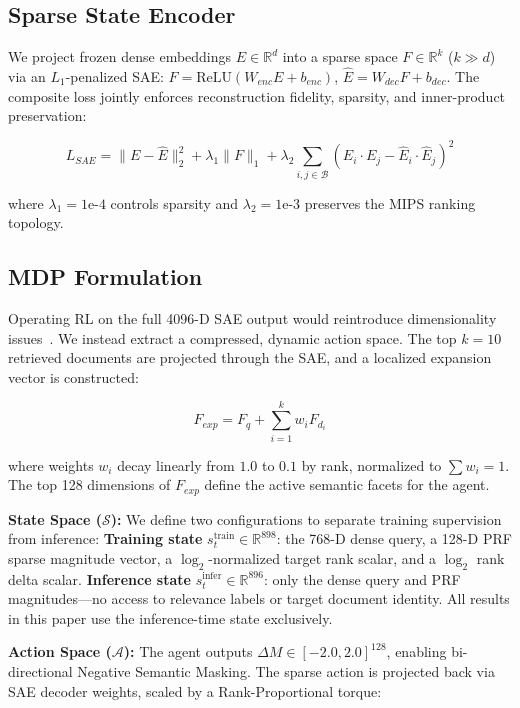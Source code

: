 \documentclass[sigconf]{acmart}
\begin{document}
\subsection{Sparse State Encoder}

We project frozen dense embeddings $E \in \mathbb{R}^d$ into a sparse space $F \in \mathbb{R}^k$ ($k \gg d$) via an $L_1$-penalized SAE: $F = \text{ReLU}(W_{enc}E + b_{enc})$, $\hat{E} = W_{dec}F + b_{dec}$. The composite loss jointly enforces reconstruction fidelity, sparsity, and inner-product preservation:

\begin{equation}
L_{SAE} = \|E - \hat{E}\|_2^2 + \lambda_1 \|F\|_1 + \lambda_2 \sum_{i,j \in \mathcal{B}} (E_i \cdot E_j - \hat{E}_i \cdot \hat{E}_j)^2
\end{equation}

where $\lambda_1 = 1\text{e-}4$ controls sparsity and $\lambda_2 = 1\text{e-}3$ preserves the MIPS ranking topology.

\subsection{MDP Formulation}

Operating RL on the full 4096-D SAE output would reintroduce dimensionality issues~\cite{lillicrap2016}. We instead extract a compressed, dynamic action space. The top $k{=}10$ retrieved documents are projected through the SAE, and a localized expansion vector is constructed:

\begin{equation}
F_{exp} = F_q + \sum_{i=1}^{k} w_i F_{d_i}
\end{equation}

where weights $w_i$ decay linearly from $1.0$ to $0.1$ by rank, normalized to $\sum w_i = 1$. The top 128 dimensions of $F_{exp}$ define the active semantic facets for the agent.

\textbf{State Space ($\mathcal{S}$):} We define two configurations to separate training supervision from inference:
\textbf{Training state} $s_t^{\text{train}} \in \mathbb{R}^{898}$: the 768-D dense query, a 128-D PRF sparse magnitude vector, a $\log_2$-normalized target rank scalar, and a $\log_2$ rank delta scalar.
\textbf{Inference state} $s_t^{\text{infer}} \in \mathbb{R}^{896}$: only the dense query and PRF magnitudes---no access to relevance labels or target document identity. All results in this paper use the inference-time state exclusively.

\textbf{Action Space ($\mathcal{A}$):} The agent outputs $\Delta M \in [-2.0, 2.0]^{128}$, enabling bi-directional Negative Semantic Masking. The sparse action is projected back via SAE decoder weights, scaled by a Rank-Proportional torque:
\end{document}
